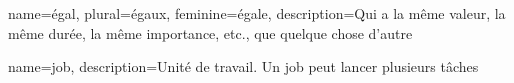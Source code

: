


{
        name=égal,
        plural=égaux,
        feminine=égale,
        description={Qui a la même valeur, la même durée, la même importance, etc., que quelque chose d'autre}
}

{
        name=job,
        description={Unité de travail. Un job peut lancer plusieurs tâches}
}










